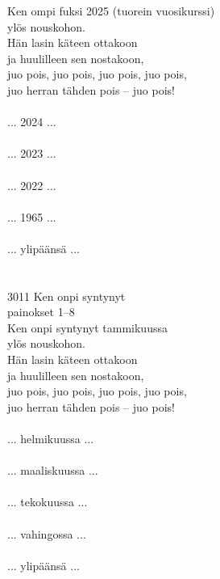 
            Ken ompi fuksi 2025 (tuorein vuosikurssi) \\
            ylös nouskohon. \\
            Hän lasin käteen ottakoon \\
            ja huulilleen sen nostakoon, \\
            juo pois, juo pois, juo pois, juo pois, \\
            juo herran tähden pois – juo pois! \\
\hspace{10mm} \\
            ... 2024 ... \\
\hspace{10mm} \\
            ... 2023 ... \\
\hspace{10mm} \\
            ... 2022 ... \\
\hspace{10mm} \\
            ... 1965 ... \\
\hspace{10mm} \\
            ... ylipäänsä ... \\
\hspace{10mm} \\
 \\
3011 Ken onpi syntynyt \\
painokset 1–8 \\
            Ken onpi syntynyt tammikuussa \\
            ylös nouskohon. \\
            Hän lasin käteen ottakoon \\
            ja huulilleen sen nostakoon, \\
            juo pois, juo pois, juo pois, juo pois, \\
            juo herran tähden pois – juo pois! \\
\hspace{10mm} \\
            ... helmikuussa ... \\
\hspace{10mm} \\
            ... maaliskuussa ... \\
\hspace{10mm} \\
            ... tekokuussa ... \\
\hspace{10mm} \\
            ... vahingossa ... \\
\hspace{10mm} \\
            ... ylipäänsä ... \\
